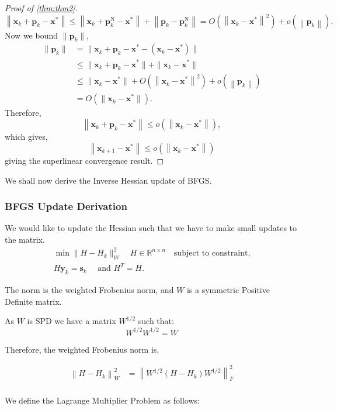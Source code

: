 \documentclass[12pt]{report}
\begin{document}
\begin{proof}[Proof of \autoref{thm:thm2}]
	\[
		\left\|\bm x_k+\bm p_k-\bm x^*\right\| \leq\left\|\bm x_k+\bm p_k^{\mathrm{N}}-\bm x^*\right\|+\left\|\bm p_k-\bm p_k^{\mathrm{N}}\right\|=O\left(\left\|\bm x_k-\bm x^*\right\|^2\right)+o\left(\left\|\bm p_k\right\|\right) .
	\]
	Now we bound $\|\bm p_k\|$,
	\begin{align*}
		\|\bm p_k\| & = \|\bm x_k +\bm p_k - \bm x^{*} -\left(\bm x_{k} - \bm x^{*}  \right) \| \\
		            & \le \|\bm x_k +\bm p_k - \bm x^{*} \|+\|\bm x_{k} - \bm x^{*}   \| \\
		            & \le \|\bm x_{k} - \bm x^{*} \| +O\left(\left\|\bm x_k-\bm x^*\right\|^2\right)+o\left(\left\|\bm p_k\right\|\right) \\
		            & = O\left( \|\bm x_{k} - \bm x^{*} \|\right)
		.\end{align*}
	Therefore,
	\[
		\left\|\bm x_k+\bm p_k-\bm x^*\right\| \leq o\left(\left\|\bm x_k-\bm x^*\right\|\right),
	\]
	which gives,
	\[\left\|\bm x_{k+1}-\bm x^*\right\| \leq o\left(\left\|\bm x_k-\bm x^*\right\|\right)\]
	giving the superlinear convergence result.
\end{proof}
We shall now derive the Inverse Hessian update of BFGS.
\subsubsection{BFGS Update Derivation}
We would like to update the Hessian such that we have to make small updates to the matrix.\\
\begin{gather*}
	\min \| H-H_{k}\|_W^{2}\quad  H \in \mathbb{R}^{n \times n} \quad \text{subject to constraint,} \\
	H \bm y_{k}=\bm{s}_k \quad \text { and } H^{T}=H
	.\end{gather*}


The norm is the weighted Frobenius norm, and $W$ is a symmetric Positive Definite matrix.

As $W$ is SPD we have a matrix $W^{1/2}$ such that:\\
$$
	W^{1 / 2} W^{1 / 2}=W
$$

Therefore, the weighted Frobenius norm is,

$$
	\begin{aligned}
		\left\|H-H_{k}\right\|_{W}^{2} & =\left\|W^{1 / 2}\left(H-H_{k}\right) W^{1 / 2}\right\|_{ F}^{2} \\
	\end{aligned}
$$

We define the Lagrange Multiplier Problem as follows:
\end{document}
